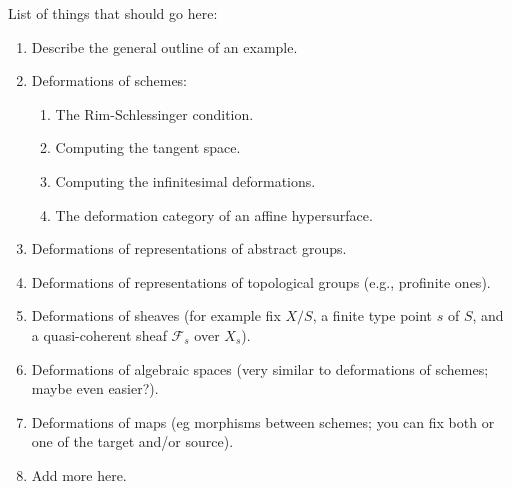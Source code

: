 \noindent
List of things that should go here:
\begin{enumerate}
\item Describe the general outline of an example.
\item Deformations of schemes:
\begin{enumerate}
\item The Rim-Schlessinger condition.
\item Computing the tangent space.
\item Computing the infinitesimal deformations.
\item The deformation category of an affine hypersurface.
\end{enumerate}
\item Deformations of representations of abstract groups.
\item Deformations of representations of topological groups
(e.g., profinite ones).
\item Deformations of sheaves (for example fix $X/S$, a finite type point
$s$ of $S$, and a quasi-coherent sheaf $\mathcal{F}_s$ over $X_s$).
\item Deformations of algebraic spaces (very similar to deformations
of schemes; maybe even easier?).
\item Deformations of maps (eg morphisms between schemes; you can fix
both or one of the target and/or source).
\item Add more here.
\end{enumerate}
















